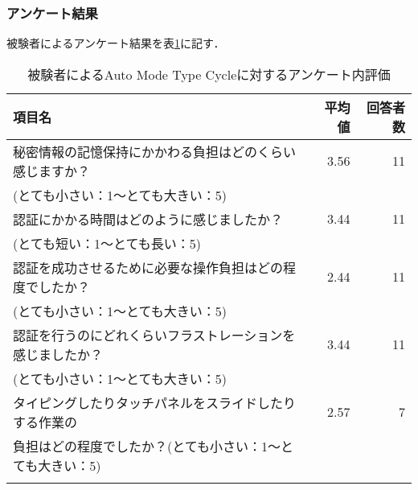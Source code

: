 \subsubsection{アンケート結果}
被験者によるアンケート結果を表\ref{tab:auto_cycle.enquete}に記す．
\begin{table}[ht]
  \caption{被験者によるAuto Mode Type Cycleに対するアンケート内評価}
  \label{tab:auto_cycle.enquete}
  \begin{center}
    \small
    \begin{tabular}{lrr}
      \bhline
      項目名 & 平均値 & 回答者数 \\ \hline
      秘密情報の記憶保持にかかわる負担はどのくらい感じますか？ & 3.56 & 11 \\
      (とても小さい：1〜とても大きい：5) & & \\
      認証にかかる時間はどのように感じましたか？ & 3.44 & 11 \\
      (とても短い：1〜とても長い：5) & & \\
      認証を成功させるために必要な操作負担はどの程度でしたか？ & 2.44 & 11 \\
      (とても小さい：1〜とても大きい：5) & & \\
      認証を行うのにどれくらいフラストレーションを感じましたか？ & 3.44 & 11 \\
      (とても小さい：1〜とても大きい：5) & & \\
      タイピングしたりタッチパネルをスライドしたりする作業の & 2.57 & 7 \\
      負担はどの程度でしたか？(とても小さい：1〜とても大きい：5) & & \\
      \bhline
    \end{tabular}
  \end{center}
\end{table}



